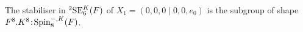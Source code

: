 \begin{theorem}
	The stabiliser in ${}^2\mathrm{SE}_6^K(F)$ of $X_1 = (0,0,0\mid 0,0,e_0)$ is the subgroup
	of shape $F^8.K^8\mathord{{\;\!{:}\;\!}}\mathrm{Spin}_8^{-,K}(F)$. 
\end{theorem}


